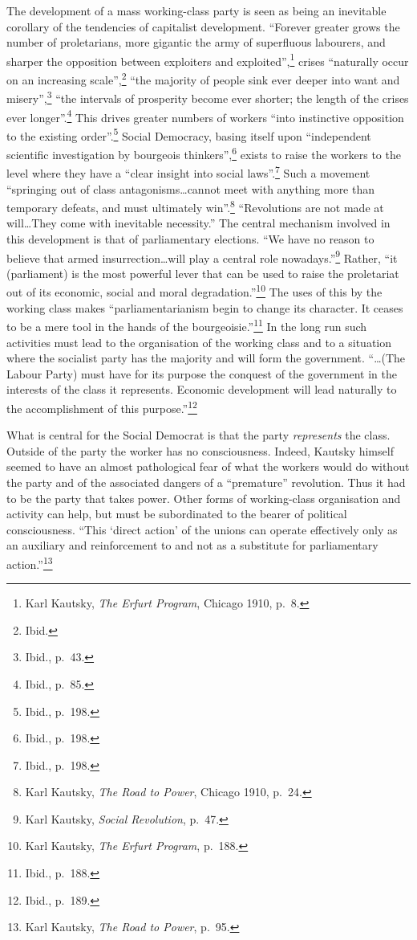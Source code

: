 The development of a mass working-class party is seen as being an inevitable corollary of the tendencies of capitalist development. ``Forever greater grows the number of proletarians, more gigantic the army of superfluous labourers, and sharper the opposition between exploiters and exploited'',\footnote{Karl Kautsky, \emph{The Erfurt Program}, Chicago 1910, p.~8.} crises ``naturally occur on an increasing scale'',\footnote{Ibid.} ``the majority of people sink ever deeper into want and misery'',\footnote{Ibid., p.~43.} ``the intervals of prosperity become ever shorter; the length of the crises ever longer''.\footnote{Ibid., p.~85.} This drives greater numbers of workers ``into instinctive opposition to the existing order''.\footnote{Ibid., p.~198.} Social Democracy, basing itself upon ``independent scientific investigation by bourgeois thinkers'',\footnote{Ibid., p.~198.} exists to raise the workers to the level where they have a ``clear insight into social laws''.\footnote{Ibid., p.~198.} Such a movement ``springing out of class antagonisms\ldots cannot meet with anything more than temporary defeats, and must ultimately win''.\footnote{Karl Kautsky, \emph{The Road to Power}, Chicago 1910, p.~24.} ``Revolutions are not made at will\ldots They come with inevitable necessity.'' The central mechanism involved in this development is that of parliamentary elections. ``We have no reason to believe that armed insurrection\ldots will play a central role nowadays.''\footnote{Karl Kautsky, \emph{Social Revolution}, p.~47.} Rather, ``it (parliament) is the most powerful lever that can be used to raise the proletariat out of its economic, social and moral degradation.''\footnote{Karl Kautsky, \emph{The Erfurt Program}, p.~188.} The uses of this by the working class makes ``parliamentarianism begin to change its character. It ceases to be a mere tool in the hands of the bourgeoisie.''\footnote{Ibid., p.~188.} In the long run such activities must lead to the organisation of the working class and to a situation where the socialist party has the majority and will form the government. ``\ldots (The Labour Party) must have for its purpose the conquest of the government in the interests of the class it represents. Economic development will lead naturally to the accomplishment of this purpose.''\footnote{Ibid., p.~189.}

What is central for the Social Democrat is that the party \emph{represents} the class. Outside of the party the worker has no consciousness. Indeed, Kautsky himself seemed to have an almost pathological fear of what the workers would do without the party and of the associated dangers of a ``premature'' revolution. Thus it had to be the party that takes power. Other forms of working-class organisation and activity can help, but must be subordinated to the bearer of political consciousness. ``This `direct action' of the unions can operate effectively only as an auxiliary and reinforcement to and not as a substitute for parliamentary action.''\footnote{Karl Kautsky, \emph{The Road to Power}, p.~95.}

